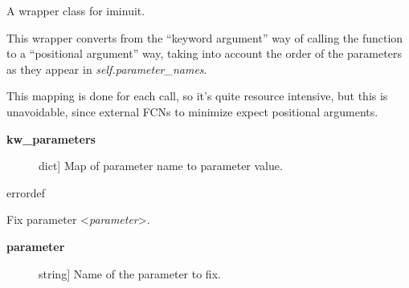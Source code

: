 \documentclass[a4paper,10pt,english]{sphinxmanual}
\begin{document}
\begin{fulllineitems}
\label{module_doc:kafe.iminuit_wrapper.IMinuit}
A wrapper class for iminuit.

\begin{fulllineitems}
\label{module_doc:kafe.iminuit_wrapper.IMinuit.FCN_wrapper}
This wrapper converts from the ``keyword argument'' way of calling the
function to a ``positional argument'' way, taking into account the order
of the parameters as they appear in \emph{self.parameter\_names}.

This mapping is done for each call, so it's quite resource intensive,
but this is unavoidable, since external FCNs to minimize expect
positional arguments.
\begin{description}
\item[{\textbf{kw\_parameters}}] \leavevmode{[}dict{]}
Map of parameter name to parameter value.

\end{description}

\end{fulllineitems}


\begin{fulllineitems}
\label{module_doc:kafe.iminuit_wrapper.IMinuit.errordef}
 errordef

\end{fulllineitems}


\begin{fulllineitems}
\label{module_doc:kafe.iminuit_wrapper.IMinuit.fix_parameter}
Fix parameter \textless{}\emph{parameter}\textgreater{}.
\begin{description}
\item[{\textbf{parameter}}] \leavevmode{[}string{]}
Name of the parameter to fix.


\end{description}
\end{fulllineitems}
\end{fulllineitems}
\end{document}
